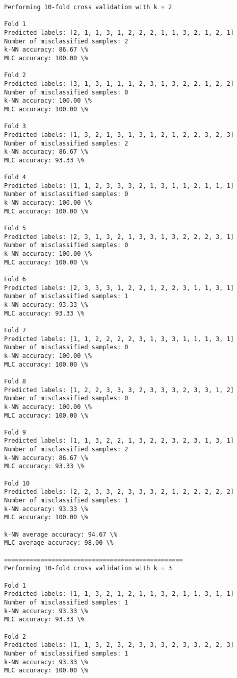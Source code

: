 \documentclass[11pt]{article}
\begin{document}
    \begin{Verbatim}[commandchars=\\\{\}]
Performing 10-fold cross validation with k = 2

Fold 1
Predicted labels: [2, 1, 1, 3, 1, 2, 2, 2, 1, 1, 3, 2, 1, 2, 1]
Number of misclassified samples: 2
k-NN accuracy: 86.67 \%
MLC accuracy: 100.00 \%

Fold 2
Predicted labels: [3, 1, 3, 1, 1, 1, 2, 3, 1, 3, 2, 2, 1, 2, 2]
Number of misclassified samples: 0
k-NN accuracy: 100.00 \%
MLC accuracy: 100.00 \%

Fold 3
Predicted labels: [1, 3, 2, 1, 3, 1, 3, 1, 2, 1, 2, 2, 3, 2, 3]
Number of misclassified samples: 2
k-NN accuracy: 86.67 \%
MLC accuracy: 93.33 \%

Fold 4
Predicted labels: [1, 1, 2, 3, 3, 3, 2, 1, 3, 1, 1, 2, 1, 1, 1]
Number of misclassified samples: 0
k-NN accuracy: 100.00 \%
MLC accuracy: 100.00 \%

Fold 5
Predicted labels: [2, 3, 1, 3, 2, 1, 3, 3, 1, 3, 2, 2, 2, 3, 1]
Number of misclassified samples: 0
k-NN accuracy: 100.00 \%
MLC accuracy: 100.00 \%

Fold 6
Predicted labels: [2, 3, 3, 3, 1, 2, 2, 1, 2, 2, 3, 1, 1, 3, 1]
Number of misclassified samples: 1
k-NN accuracy: 93.33 \%
MLC accuracy: 93.33 \%

Fold 7
Predicted labels: [1, 1, 2, 2, 2, 2, 3, 1, 3, 3, 1, 1, 1, 3, 1]
Number of misclassified samples: 0
k-NN accuracy: 100.00 \%
MLC accuracy: 100.00 \%

Fold 8
Predicted labels: [1, 2, 2, 3, 3, 3, 2, 3, 3, 3, 2, 3, 3, 1, 2]
Number of misclassified samples: 0
k-NN accuracy: 100.00 \%
MLC accuracy: 100.00 \%

Fold 9
Predicted labels: [1, 1, 3, 2, 2, 1, 3, 2, 2, 3, 2, 3, 1, 3, 1]
Number of misclassified samples: 2
k-NN accuracy: 86.67 \%
MLC accuracy: 93.33 \%

Fold 10
Predicted labels: [2, 2, 3, 3, 2, 3, 3, 3, 2, 1, 2, 2, 2, 2, 2]
Number of misclassified samples: 1
k-NN accuracy: 93.33 \%
MLC accuracy: 100.00 \%

k-NN average accuracy: 94.67 \%
MLC average accuracy: 98.00 \%

=================================================
Performing 10-fold cross validation with k = 3

Fold 1
Predicted labels: [1, 1, 3, 2, 1, 2, 1, 1, 3, 2, 1, 1, 3, 1, 1]
Number of misclassified samples: 1
k-NN accuracy: 93.33 \%
MLC accuracy: 93.33 \%

Fold 2
Predicted labels: [1, 1, 3, 2, 3, 2, 3, 3, 3, 2, 3, 3, 2, 2, 3]
Number of misclassified samples: 1
k-NN accuracy: 93.33 \%
MLC accuracy: 100.00 \%


\end{Verbatim}
\end{document}

